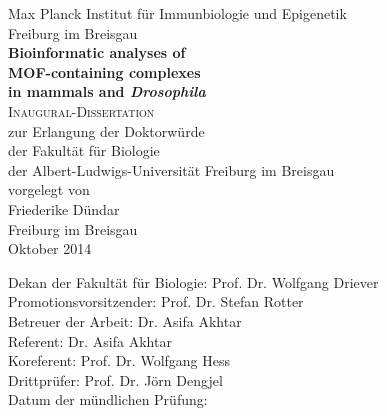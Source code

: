 \documentclass[11pt, a4paper, twoside]{MPIthesis} %
\begin{document}
\begin{titlepage}
\begin{center}

\large Max Planck Institut für Immunbiologie und Epigenetik\\Freiburg im Breisgau \\[1cm]



{\huge \textbf{Bioinformatic analyses of\\MOF-containing complexes\\[9pt]in mammals and \textit{Drosophila}}}\\[1.5cm] %


\textsc{\LARGE Inaugural-Dissertation}\\[1cm] %
\large zur Erlangung der Doktorwürde\\der Fakultät für Biologie\\der Albert-Ludwigs-Universität Freiburg im Breisgau\\[1cm] %

\large vorgelegt von\\Friederike Dündar \\[1.5cm]

\large Freiburg im Breisgau \\ Oktober 2014 \\ %

\vfill
\end{center}

\end{titlepage}


\thispagestyle{empty}
\vspace*{\fill}
Dekan der Fakultät für Biologie: Prof. Dr. Wolfgang Driever \\
Promotionsvorsitzender: Prof. Dr. Stefan Rotter \\
Betreuer der Arbeit: Dr. Asifa Akhtar \\
Referent: Dr. Asifa Akhtar \\
Koreferent: Prof. Dr. Wolfgang Hess \\
Drittprüfer: Prof. Dr. Jörn Dengjel\\
Datum der mündlichen Prüfung:
\clearpage
\end{document}

